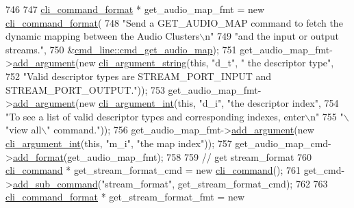 \begin{DoxyCode}
746 
747     \hyperlink{classcli__command__format}{cli\_command\_format} * get\_audio\_map\_fmt = \textcolor{keyword}{new} 
      \hyperlink{classcli__command__format}{cli\_command\_format}(
748         \textcolor{stringliteral}{"Send a GET\_AUDIO\_MAP command to fetch the dynamic mapping between the Audio Clusters\(\backslash\)n"}
749         \textcolor{stringliteral}{"and the input or output streams."},
750         &\hyperlink{classcmd__line_a60c1233984e8d4ecbde33a91f5968b20}{cmd\_line::cmd\_get\_audio\_map});
751     get\_audio\_map\_fmt->\hyperlink{classcli__command__format_ac3fc6d13a227c195d5ee6f7b78eba9cd}{add\_argument}(\textcolor{keyword}{new} \hyperlink{classcli__argument__string}{cli\_argument\_string}(\textcolor{keyword}{this}, \textcolor{stringliteral}{"d\_t"}, \textcolor{stringliteral}{"
      the descriptor type"},
752                                                             \textcolor{stringliteral}{"Valid descriptor types are STREAM\_PORT\_INPUT
       and STREAM\_PORT\_OUTPUT."}));
753     get\_audio\_map\_fmt->\hyperlink{classcli__command__format_ac3fc6d13a227c195d5ee6f7b78eba9cd}{add\_argument}(\textcolor{keyword}{new} \hyperlink{classcli__argument__int}{cli\_argument\_int}(\textcolor{keyword}{this}, \textcolor{stringliteral}{"d\_i"}, \textcolor{stringliteral}{"the
       descriptor index"},
754                                                          \textcolor{stringliteral}{"To see a list of valid descriptor types and
       corresponding indexes, enter\(\backslash\)n"}
755                                                          \textcolor{stringliteral}{"\(\backslash\)"view all\(\backslash\)" command."}));
756     get\_audio\_map\_fmt->\hyperlink{classcli__command__format_ac3fc6d13a227c195d5ee6f7b78eba9cd}{add\_argument}(\textcolor{keyword}{new} \hyperlink{classcli__argument__int}{cli\_argument\_int}(\textcolor{keyword}{this}, \textcolor{stringliteral}{"m\_i"}, \textcolor{stringliteral}{"the map
       index"}));
757     get\_audio\_map\_cmd->\hyperlink{classcli__command_aa9ec38e761644d946f8db2b920e39921}{add\_format}(get\_audio\_map\_fmt);
758 
759     \textcolor{comment}{// get stream\_format}
760     \hyperlink{classcli__command}{cli\_command} * get\_stream\_format\_cmd = \textcolor{keyword}{new} \hyperlink{classcli__command}{cli\_command}();
761     get\_cmd->\hyperlink{classcli__command_aa73a67e8ebb6facd4b40ced66279b226}{add\_sub\_command}(\textcolor{stringliteral}{"stream\_format"}, get\_stream\_format\_cmd);
762 
763     \hyperlink{classcli__command__format}{cli\_command\_format} * get\_stream\_format\_fmt = \textcolor{keyword}{new} 

\end{DoxyCode}
